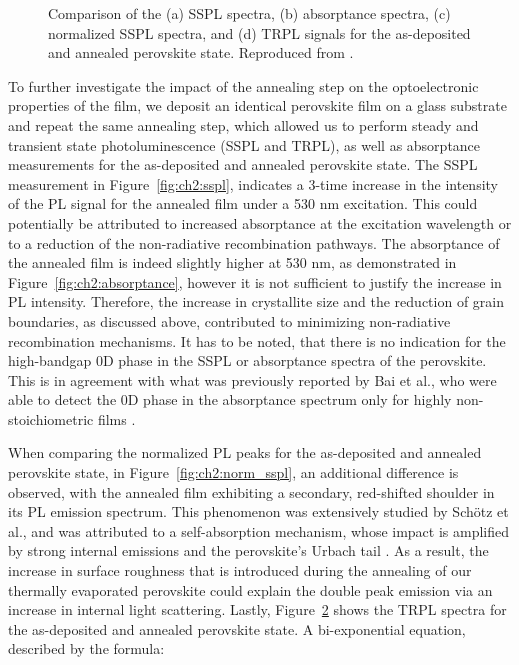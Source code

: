 \begin{figure}[ht!]
\begin{subfigure}[t]{0.4\textwidth}
        \caption{}
        \label{fig:ch2:trpl}
    \end{subfigure}
    \caption[SSPL, TRPL, and absorptance of the as-deposited and annealed perovskite state.]{Comparison of the (a) SSPL spectra, (b) absorptance spectra, (c) normalized SSPL spectra, and (d) TRPL signals for the as-deposited and annealed perovskite state. Reproduced from \cite{Papadopoulou2024InEllipsometry}.}
\end{figure}



To further investigate the impact of the annealing step on the optoelectronic properties of the film, we deposit an identical perovskite film on a glass substrate and repeat the same annealing step, which allowed us to perform steady and transient state photoluminescence (SSPL and TRPL), as well as absorptance measurements for the as-deposited and annealed perovskite state. The SSPL measurement in Figure~\ref{fig:ch2:sspl}, indicates a 3-time increase in the intensity of the PL signal for the annealed film under a 530 nm excitation. This could potentially be attributed to increased absorptance at the excitation wavelength or to a reduction of the non-radiative recombination pathways. The absorptance of the annealed film is indeed slightly higher at 530 nm, as demonstrated in Figure~\ref{fig:ch2:absorptance}, however it is not sufficient to justify the increase in PL intensity. Therefore, the increase in crystallite size and the reduction of grain boundaries, as discussed above, contributed to minimizing non-radiative recombination mechanisms. It has to be noted, that there is no indication for the high-bandgap 0D  phase in the SSPL or absorptance spectra of the perovskite. This is in agreement with what was previously reported by Bai et al., who were able to detect the 0D phase in the absorptance spectrum only for highly non-stoichiometric films \cite{Bai2019AStability}. 

When comparing the normalized PL peaks for the as-deposited and annealed perovskite state, in Figure~\ref{fig:ch2:norm_sspl}, an additional difference is observed, with the annealed film exhibiting a secondary, red-shifted shoulder in its PL emission spectrum. This phenomenon was extensively studied by Schötz et al., and was attributed to a self-absorption mechanism, whose impact is amplified by strong internal emissions and the perovskite's Urbach tail \cite{Schotz2020DoubleSelf-absorption}. As a result, the increase in surface roughness that is introduced during the annealing of our thermally evaporated perovskite could explain the double peak emission via an increase in internal light scattering. Lastly, Figure~\ref{fig:ch2:trpl} shows the TRPL spectra for the as-deposited and annealed perovskite state. A bi-exponential equation, described by the formula: 

